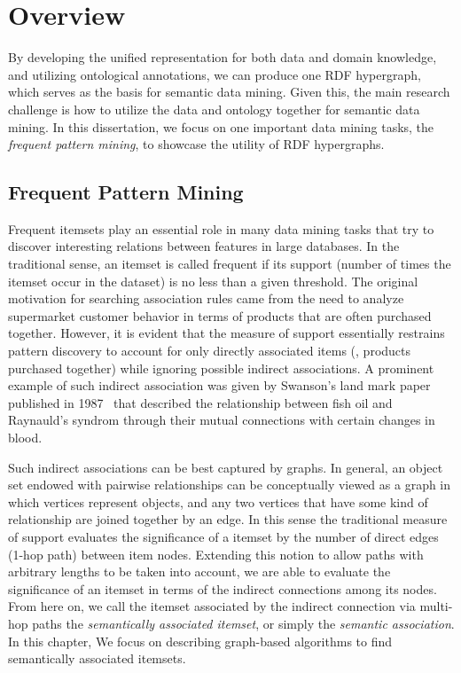 \section{Overview}
By developing the unified representation for both data and domain knowledge, and utilizing ontological annotations, we can produce one RDF hypergraph, which serves as the basis for semantic data mining. Given this, the main research challenge is how to utilize the data and ontology together for semantic data mining. In this dissertation, we focus on one important data mining tasks, the {\em frequent pattern mining}, to showcase the utility of RDF hypergraphs.

\subsection{Frequent Pattern Mining}
\label{sec:association}
Frequent itemsets play an essential role in many data mining tasks that try to discover interesting relations between features in large databases. In the traditional sense, an itemset is called frequent if its support (number of times the itemset occur in the dataset) is no less than a given threshold. The original motivation for searching association rules came from the need to analyze supermarket customer behavior in terms of products that are often purchased together. However, it is evident that the measure of support essentially restrains pattern discovery to account for only directly associated items (\eg, products purchased together) while ignoring possible indirect associations. A prominent example of such indirect association was given by Swanson's land mark paper published in 1987~\cite{swanson87} that described the relationship between fish oil and Raynauld's syndrom through their mutual connections with certain changes in blood.

Such indirect associations can be best captured by graphs. In general, an object set endowed with pairwise relationships can be conceptually viewed as a graph in which vertices represent objects, and any two vertices that have some kind of relationship are joined together by an edge. In this sense the traditional measure of support evaluates the significance of a itemset by the number of direct edges (1-hop path) between item nodes. Extending this notion to allow paths with arbitrary lengths to be taken into account, we are able to evaluate the significance of an itemset in terms of the indirect connections among its nodes. From here on, we call the itemset associated by the indirect connection via multi-hop paths the \emph{semantically associated itemset}, or simply the \emph{semantic association}. In this chapter, We focus on describing graph-based algorithms to find semantically associated itemsets.

